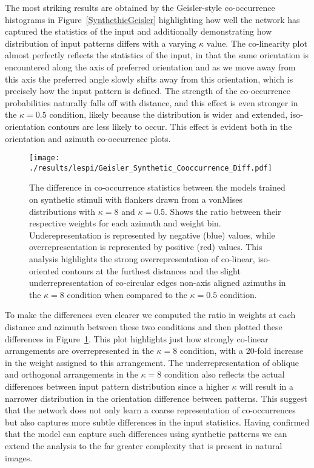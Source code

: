 The most striking results are obtained by the Geisler-style
co-occurrence histograms in Figure~\ref{SynthethicGeisler}
highlighting how well the network has captured the statistics of the
input and additionally demonstrating how distribution of input
patterns differs with a varying $\kappa$ value. The co-linearity plot
almost perfectly reflects the statistics of the input, in that the
same orientation is encountered along the axis of preferred
orientation and as we move away from this axis the preferred angle
slowly shifts away from this orientation, which is precisely how the
input pattern is defined. The strength of the co-occurrence
probabilities naturally falls off with distance, and this effect is
even stronger in the $\kappa=0.5$ condition, likely because the
distribution is wider and extended, iso-orientation contours are less
likely to occur. This effect is evident both in the orientation and
azimuth co-occurrence plots.

\begin{figure}
  \centering
  \texttt{[image: ./results/lespi/Geisler\_Synthetic\_Cooccurrence\_Diff.pdf]}
	\caption{The difference in co-occurrence statistics between the
      models trained on synthetic stimuli with flankers drawn from a
      vonMises distributions with $\kappa=8$ and $\kappa=0.5$. Shows
      the ratio between their respective weights for each azimuth and
      weight bin. Underepresentation is represented by negative (blue)
      values, while overrepresentation is represented by positive
      (red) values. This analysis highlights the strong
      overrepresentation of co-linear, iso-oriented contours at the
      furthest distances and the slight underrepresentation of
      co-circular edges non-axis aligned azimuths in the $\kappa=8$
      condition when compared to the $\kappa=0.5$ condition.}
	\label{SyntheticGeislerDiff}
\end{figure}

To make the differences even clearer we computed the ratio in weights
at each distance and azimuth between these two conditions and then
plotted these differences in Figure~\ref{SyntheticGeislerDiff}. This
plot highlights just how strongly co-linear arrangements are
overrepresented in the $\kappa=8$ condition, with a 20-fold increase
in the weight assigned to this arrangement. The underrepresentation of
oblique and orthogonal arrangements in the $\kappa=8$ condition also
reflects the actual differences between input pattern distribution
since a higher $\kappa$ will result in a narrower distribution in the
orientation difference between patterns. This suggest that the network
does not only learn a coarse representation of co-occurrences but also
captures more subtle differences in the input statistics. Having
confirmed that the model can capture such differences using synthetic
patterns we can extend the analysis to the far greater complexity that
is present in natural images.

